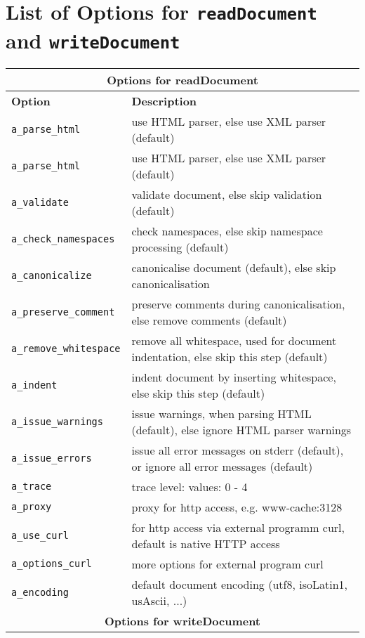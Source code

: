 \documentclass[11pt,a4paper,headsepline, bibtotoc]{scrreprt}
\begin{document}
\chapter{List of Options for \texttt{readDocument} and \texttt{writeDocument}}\label{options}
 \setlongtables 
\begin{longtable}{|l|p{}|} \hline
\multicolumn{2}{|c|}{\textbf{Options for readDocument}} \\ \hline
\textbf{Option} & \textbf{Description} \\ \hline
\texttt{a\_parse\_html} & use HTML parser, else use XML parser (default) \\ \hline
\texttt{a\_parse\_html} & use HTML parser, else use XML parser (default)\\ \hline
\texttt{a\_validate} & validate document, else skip validation (default)\\ \hline
\texttt{a\_check\_namespaces} & check namespaces, else skip namespace processing (default)\\ \hline
\texttt{a\_canonicalize} & canonicalise document (default), else skip canonicalisation\\ \hline
\texttt{a\_preserve\_comment} & preserve comments during canonicalisation, else remove comments (default)\\ \hline
\texttt{a\_remove\_whitespace} & remove all whitespace, used for document indentation, else skip this step (default)\\ \hline
\texttt{a\_indent} & indent document by inserting whitespace, else skip this step (default)\\ \hline
\texttt{a\_issue\_warnings} & issue warnings, when parsing HTML (default), else ignore HTML parser warnings\\ \hline
\texttt{a\_issue\_errors} & issue all error messages on stderr (default), or ignore all error messages (default)\\ \hline
\texttt{a\_trace} & trace level: values: 0 - 4\\ \hline
\texttt{a\_proxy} & proxy for http access, e.g. www-cache:3128\\ \hline
\texttt{a\_use\_curl} & for http access via external programm curl, default is native HTTP access\\ \hline
\texttt{a\_options\_curl} & more options for external program curl\\ \hline
\texttt{a\_encoding} & default document encoding (utf8, isoLatin1, usAscii, ...)\\ \hline \hline
\multicolumn{2}{|c|}{\textbf{Options for writeDocument}} \\ \hline 

\end{longtable}
\end{document}
